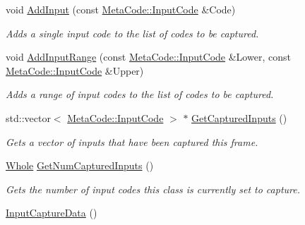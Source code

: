 \begin{DoxyCompactItemize}
\item 
void \hyperlink{classMezzanine_1_1UI_1_1InputCaptureData_a9d82c38caa461a6b92fd91d0eadf2a2a}{AddInput} (const \hyperlink{classMezzanine_1_1MetaCode_a3b5633f0145bf3287cf53a3f05b5563c}{MetaCode::InputCode} \&Code)
\begin{DoxyCompactList}\small\item\em Adds a single input code to the list of codes to be captured. \item\end{DoxyCompactList}\item 
void \hyperlink{classMezzanine_1_1UI_1_1InputCaptureData_a187f20c548df845953a8e067f0a3c9de}{AddInputRange} (const \hyperlink{classMezzanine_1_1MetaCode_a3b5633f0145bf3287cf53a3f05b5563c}{MetaCode::InputCode} \&Lower, const \hyperlink{classMezzanine_1_1MetaCode_a3b5633f0145bf3287cf53a3f05b5563c}{MetaCode::InputCode} \&Upper)
\begin{DoxyCompactList}\small\item\em Adds a range of input codes to the list of codes to be captured. \item\end{DoxyCompactList}\item 
std::vector$<$ \hyperlink{classMezzanine_1_1MetaCode_a3b5633f0145bf3287cf53a3f05b5563c}{MetaCode::InputCode} $>$ $\ast$ \hyperlink{classMezzanine_1_1UI_1_1InputCaptureData_ad34a3ed3c5072330b8d3ab3615060011}{GetCapturedInputs} ()
\begin{DoxyCompactList}\small\item\em Gets a vector of inputs that have been captured this frame. \item\end{DoxyCompactList}\item 
\hyperlink{namespaceMezzanine_adcbb6ce6d1eb4379d109e51171e2e493}{Whole} \hyperlink{classMezzanine_1_1UI_1_1InputCaptureData_a2a509eb5ff2db0e83174be5c966fb753}{GetNumCapturedInputs} ()
\begin{DoxyCompactList}\small\item\em Gets the number of input codes this class is currently set to capture. \item\end{DoxyCompactList}\item 
\hypertarget{classMezzanine_1_1UI_1_1InputCaptureData_a2207d5ca235a63a8ce76e99300984f20}{
\hyperlink{classMezzanine_1_1UI_1_1InputCaptureData_a2207d5ca235a63a8ce76e99300984f20}{InputCaptureData} ()}
\label{classMezzanine_1_1UI_1_1InputCaptureData_a2207d5ca235a63a8ce76e99300984f20}


\end{DoxyCompactItemize}
